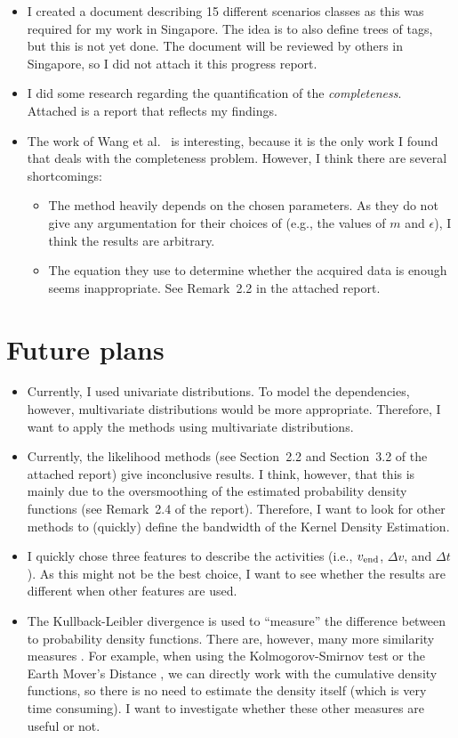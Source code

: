 \documentclass[10pt,final,a4paper,oneside,onecolumn]{article}
\begin{document}
\begin{itemize}
	\item I created a document describing 15 different scenarios classes as this was required for my work in Singapore. The idea is to also define trees of tags, but this is not yet done. The document will be reviewed by others in Singapore, so I did not attach it this progress report.
	\item I did some research regarding the quantification of the \emph{completeness}. Attached is a report that reflects my findings.
	\item The work of Wang et al.\ \cite{wang2017much} is interesting, because it is the only work I found that deals with the completeness problem. However, I think there are several shortcomings:
	\begin{itemize}
		\item The method heavily depends on the chosen parameters. As they do not give any argumentation for their choices of (e.g., the values of $m$ and $\epsilon$), I think the results are arbitrary. 
		\item The equation they use to determine whether the acquired data is enough seems inappropriate. See Remark~2.2 in the attached report.
	\end{itemize}
\end{itemize}

\section{Future plans}

\begin{itemize}
	\item Currently, I used univariate distributions. To model the dependencies, however, multivariate distributions would be more appropriate. Therefore, I want to apply the methods using multivariate distributions.
	\item Currently, the likelihood methods (see Section~2.2 and Section~3.2 of the attached report) give inconclusive results. I think, however, that this is mainly due to the oversmoothing of the estimated probability density functions (see Remark~2.4 of the report). Therefore, I want to look for other methods to (quickly) define the bandwidth of the Kernel Density Estimation.
	\item I quickly chose three features to describe the activities (i.e., $v_{\textup{end}}$, $\Delta v$, and $\Delta t$). As this might not be the best choice, I want to see whether the results are different when other features are used.
	\item The Kullback-Leibler divergence \cite{kullback1951} is used to ``measure'' the difference between to probability density functions. There are, however, many more similarity measures \cite{cha2007surveyPDFmeasures}. For example, when using the Kolmogorov-Smirnov test or the Earth Mover's Distance \cite{cha2007surveyPDFmeasures}, we can directly work with the cumulative density functions, so there is no need to estimate the density itself (which is very time consuming). I want to investigate whether these other measures are useful or not.
\end{itemize}
\end{document}
